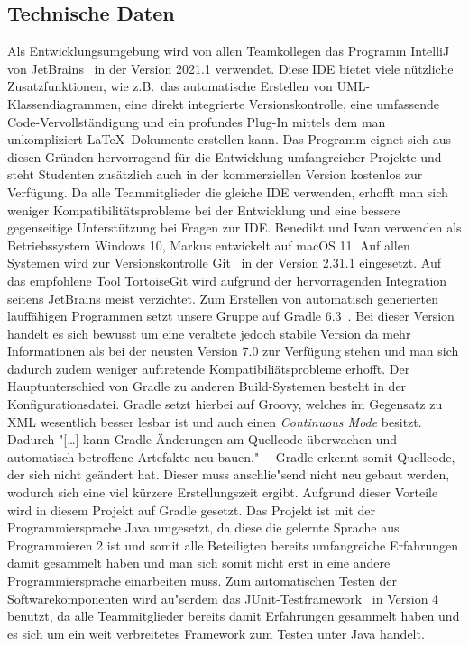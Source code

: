 \newpage

\subsection{Technische Daten}\label{subsec:technische-daten}
Als Entwicklungsumgebung wird von allen Teamkollegen das Programm IntelliJ von JetBrains~\cite{intellij} in der Version 2021.1 verwendet.
Diese IDE bietet viele n\"utzliche Zusatzfunktionen, wie z.B.\ das automatische Erstellen von UML-Klassendiagrammen, eine direkt integrierte Versionskontrolle, eine umfassende Code-Vervollst\"andigung und ein profundes Plug-In mittels dem man unkompliziert \LaTeX\ Dokumente erstellen kann.
Das Programm eignet sich aus diesen Gr\"unden hervorragend f\"ur die Entwicklung umfangreicher Projekte und steht Studenten zus\"atzlich auch in der kommerziellen Version kostenlos zur Verf\"ugung.
Da alle Teammitglieder die gleiche IDE verwenden, erhofft man sich weniger Kompatibilit\"atsprobleme bei der Entwicklung und eine bessere gegenseitige Unterst\"utzung bei Fragen zur IDE.
Benedikt und Iwan verwenden als Betriebssystem Windows 10, Markus entwickelt auf macOS 11.
Auf allen Systemen wird zur Versionskontrolle Git~\cite{git} in der Version 2.31.1 eingesetzt.
Auf das empfohlene Tool TortoiseGit wird aufgrund der hervorragenden Integration seitens JetBrains meist verzichtet.
Zum Erstellen von automatisch generierten lauff\"ahigen Programmen setzt unsere Gruppe auf Gradle 6.3~\cite{gradle}.
Bei dieser Version handelt es sich bewusst um eine veraltete jedoch stabile Version da mehr Informationen als bei der neusten Version 7.0 zur Verf\"ugung stehen und man sich dadurch zudem weniger auftretende Kompatibili\"atsprobleme erhofft.
Der Hauptunterschied von Gradle zu anderen Build-Systemen besteht in der Konfigurationsdatei.
Gradle setzt hierbei auf Groovy, welches im Gegensatz zu XML wesentlich besser lesbar ist und auch einen \emph{Continuous Mode} besitzt.
Dadurch "[\ldots] kann Gradle \"Anderungen am Quellcode \"uberwachen und automatisch betroffene Artefakte neu bauen."~\cite{besserCoden:gradle} %
\ Gradle erkennt somit Quellcode, der sich nicht ge\"andert hat.
Dieser muss anschlie"send nicht neu gebaut werden, wodurch sich eine viel k\"urzere Erstellungszeit ergibt.
Aufgrund dieser Vorteile wird in diesem Projekt auf Gradle gesetzt.
Das Projekt ist mit der Programmiersprache Java umgesetzt, da diese die gelernte Sprache aus Programmieren 2 ist und somit alle Beteiligten bereits umfangreiche Erfahrungen damit gesammelt haben und man sich somit nicht erst in eine andere Programmiersprache einarbeiten muss.
Zum automatischen Testen der Softwarekomponenten wird au"serdem das JUnit-Testframework~\cite{junit} in Version 4 benutzt, da alle Teammitglieder bereits damit Erfahrungen gesammelt haben und es sich um ein weit verbreitetes Framework zum Testen unter Java handelt.

